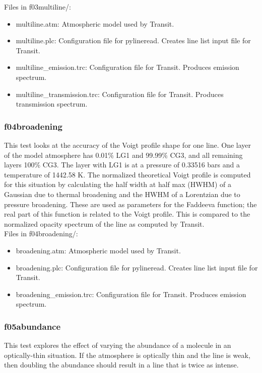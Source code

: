 \documentclass[letterpaper, 12pt]{article}
\begin{document}
Files in f03multiline/:
\begin{itemize} \itemsep0pt
  \item multiline.atm: Atmospheric model used by Transit.
  \item multiline.plc: Configuration file for pylineread. Creates line 
        list input file for Transit.
  \item multiline{\_}emission.trc: Configuration file for Transit. Produces 
        emission spectrum.
  \item multiline{\_}transmission.trc: Configuration file for Transit. Produces 
        transmission spectrum.
\end{itemize}

\subsubsection{f04broadening}
\label{sec:broadening}
This test looks at the accuracy of the Voigt profile shape for one line. 
One layer of the model atmosphere has 0.01\% LG1 and 99.99\% CG3, and 
all remaining layers 100\% CG3. The layer with LG1 is at a pressure of 
0.33516 bars and a temperature of 1442.58 K. The normalized theoretical Voigt 
profile is computed for this situation by calculating the half width at 
half max (HWHM) of a Gaussian due to thermal broadening and the HWHM of 
a Lorentzian due to pressure broadening. These are used as parameters for 
the Faddeeva function; the real part of this function is related to the 
Voigt profile. This is compared to the normalized opacity spectrum of the 
line as computed by Transit.\\

Files in f04broadening/:
\begin{itemize} \itemsep0pt
  \item broadening.atm: Atmospheric model used by Transit.
  \item broadening.plc: Configuration file for pylineread. Creates line 
        list input file for Transit.
  \item broadening{\_}emission.trc: Configuration file for Transit. Produces 
        emission spectrum.
\end{itemize}

\subsubsection{f05abundance}
\label{sec:abundance}
This test explores the effect of varying the abundance of a molecule in an 
optically-thin situation. If the atmosphere is optically thin and the line 
is weak, then doubling the abundance should result in a line that is twice as 
intense.
\end{document}
